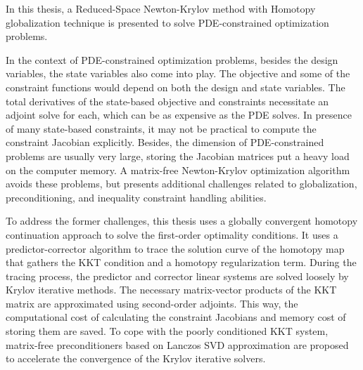  
 In this thesis, a Reduced-Space Newton-Krylov method with Homotopy globalization technique is presented to solve PDE-constrained optimization problems.  
 
In the context of PDE-constrained optimization problems, besides the design variables, the state variables also come into play. The objective and some of the constraint functions would depend on both the design and state variables. The  
total derivatives of the state-based objective and constraints necessitate an adjoint solve for each, which can be as expensive as the PDE solves. In presence of many state-based constraints, it may not be practical to compute the constraint Jacobian explicitly. Besides, the dimension of PDE-constrained problems are usually very large, storing the Jacobian matrices put a heavy load on the computer memory.  A matrix-free Newton-Krylov optimization algorithm avoids these problems, but presents additional challenges related to globalization, preconditioning, and inequality constraint handling abilities. 

To address the former challenges, this thesis uses a globally convergent homotopy continuation approach to solve the first-order optimality conditions. It uses a predictor-corrector algorithm to trace the solution curve of the homotopy map that gathers the KKT condition and a homotopy regularization term. During the tracing process, the predictor and corrector linear systems are solved loosely by Krylov iterative methods. The necessary matrix-vector products of the KKT matrix are approximated using second-order adjoints. This way, the computational cost of calculating the constraint Jacobians and memory cost of storing them are saved.  To cope with the poorly conditioned KKT system, matrix-free preconditioners based on Lanczos SVD approximation are proposed to accelerate the convergence of the Krylov iterative solvers.  

